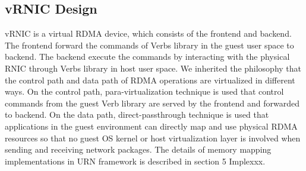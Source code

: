 \subsection{vRNIC Design}
vRNIC is a virtual RDMA device, which consists of the frontend and backend. The frontend forward the commands of Verbs library in the guest user space to backend. The backend execute the commands by interacting with the physical RNIC through Verbs library in host user space. We inherited the philosophy that the control path and data path of RDMA operations are virtualized in different ways\cite{pfefferle2015hybrid}\cite{he2020masq}\cite{kim2019freeflow}. On the control path, para-virtualization technique is used that control commands from the guest Verb library are served by the frontend and forwarded to backend. On the data path, direct-passthrough technique is used that applications in the guest environment can directly map and use physical RDMA resources so that no guest OS kernel or host virtualization layer is involved when sending and receiving network packages. The details of memory mapping implementations in URN framework is described in section 5 Implexxx.

